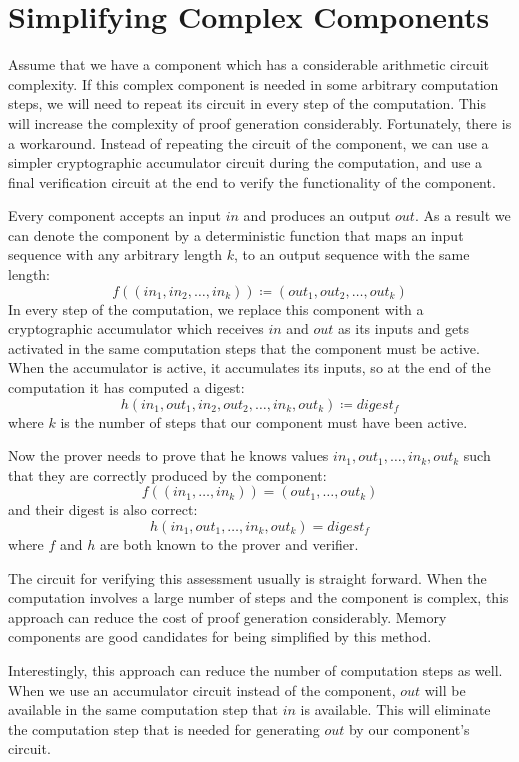 \pagebreak


\section{Simplifying Complex Components}\label{sec:simplifying-complex-components}

Assume that we have a component which has a considerable arithmetic circuit complexity. If this complex component
is needed in some arbitrary computation steps, we will need to repeat its circuit in every step of the computation. This
will increase the complexity of proof generation considerably. Fortunately, there is a workaround. Instead of
repeating the circuit of the component, we can use a simpler cryptographic accumulator circuit during the
computation, and use a final verification circuit at the end to verify the functionality of the component.

Every component accepts an input $in$ and produces an output $out$. As a result we can denote the component by a
deterministic function that maps an input sequence with any arbitrary length $k$, to an output sequence with the same
length:
\[
    f((in_1,in_2,\dots,in_k)) \coloneqq (out_1,out_2,\dots,out_k)
\]
In every step of the computation, we replace this component with a cryptographic accumulator which receives $in$ and
$out$ as its inputs and gets activated in the same computation steps that the component must be active. When the
accumulator is active, it accumulates its inputs, so at the end of the computation it has computed a digest:
\[
    h(in_1,out_1,in_2,out_2,\dots,in_k,out_k) \coloneqq digest_f
\]
where $k$ is the number of steps that our component must have been active.

Now the prover needs to prove that he knows values $in_1,out_1,\dots,in_k,out_k$ such that they are correctly
produced by the component:
\[
    f((in_1,\dots,in_k)) = (out_1,\dots,out_k)
\]
and their digest is also correct:
\[
    h(in_1,out_1,\dots,in_k,out_k) = digest_f
\]
where $f$ and $h$ are both known to the prover and verifier.

The circuit for verifying this assessment usually is straight forward. When the computation involves a large
number of steps and the component is complex, this approach can reduce the cost of proof generation considerably. Memory
components are good candidates for being simplified by this method.

Interestingly, this approach can reduce the number of computation steps as well. When we use an accumulator circuit
instead of the component, $out$ will be available in the same computation step that $in$ is available. This will
eliminate the computation step that is needed for generating $out$ by our component's circuit.
%
